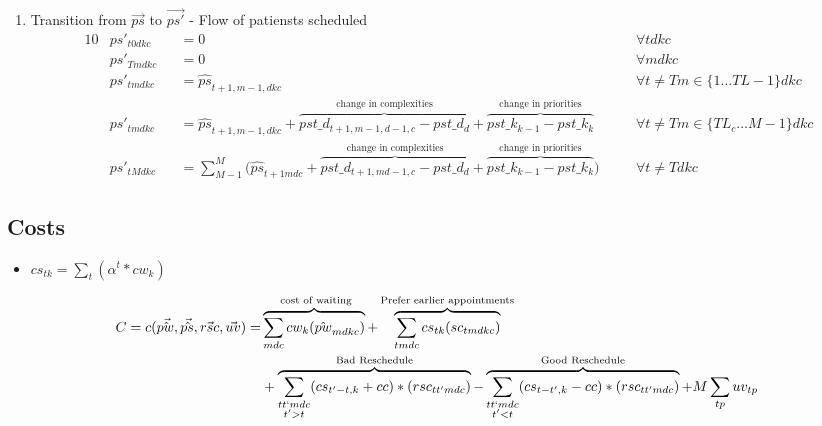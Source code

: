 \begin{enumerate}
	
	\item Transition from $\vec{ps}$ to $\vec{ps'}$ - Flow of patiensts scheduled
	\begin{alignat}{10}
		& ps'_{t0dkc} 
			&& = 0 \quad
			&& \forall tdkc \\  
		& ps'_{Tmdkc} 
			&& = 0 \quad
			&& \forall mdkc \\  
		& ps'_{tmdkc} 
			&& = \hat{ps}_{t+1,m-1,dkc} \quad 
			&& \forall t \ne T m \in \{ 1... TL-1 \} dkc \\ 
		& ps'_{tmdkc} 
			&& = \hat{ps}_{t+1,m-1,dkc} + 
			\overbrace{pst\_d_{t+1,m-1,d-1,c} - pst\_d_{d}}^\text{
				change in complexities}  + 
			\overbrace{pst\_k_{k-1} - pst\_k_{k}}^\text{
				change in priorities} \quad 
			&& \forall t \ne T m \in \{ TL_{c}...M-1 \} dkc \\  
		& ps'_{tMdkc} 
			&& = \sum_{M-1}^{M} \big( 
			\hat{ps}_{t+1mdc} + 
			\overbrace{pst\_d_{t+1,md-1,c} - pst\_d_{d}}^\text{
				change in complexities} + 
			\overbrace{pst\_k_{k-1} - pst\_k_{k}}^\text{
				change in priorities} \big) \quad
			&& \forall t \ne T dkc
	\end{alignat}
\end{enumerate}

\subsection{Costs}

\begin{itemize}
	\item $cs_{tk} = \sum_t (\alpha^t * cw_{k})$
\end{itemize}

\begin{equation}\begin{alignedat}{10}
		& C = c(\vec{\hat{pw}}, \vec{\hat{ps}}, \vec{rsc}, \vec{uv}) = 
		&& 
		\overbrace{ \sum_{mdc} cw_{k} (\hat{pw}_{mdkc}) }^\text{
			cost of waiting}  + 
		\overbrace{
			\sum_{tmdc} cs_{tk} (sc_{tmdkc})
		}^\text{Prefer earlier appointments} \\ 
		&	&&  +
		\overbrace{
			\sum_{
				\substack{tt`mdc \\ t' > t}} 
			(cs_{t'-t, k} + cc) * (rsc_{tt'mdc})}^\text{Bad Reschedule} - 
		\overbrace{ 
			\sum_{
				\substack{tt`mdc \\ t' < t}}
			(cs_{t-t', k} - cc) * (rsc_{tt'mdc})}^\text{Good Reschedule} + 
		M \sum_{tp} uv_{tp}
\end{alignedat}\end{equation}
